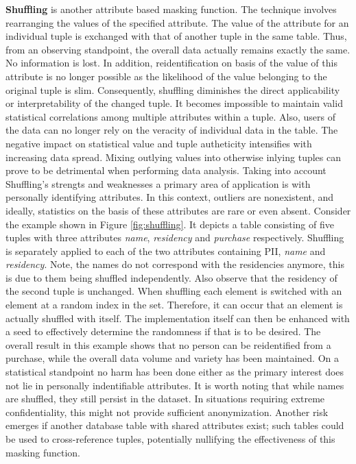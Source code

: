 \indent\textbf{Shuffling} is another attribute based masking function. The technique involves rearranging the values of the specified attribute. The value of the attribute for an individual tuple is exchanged with that of another tuple in the same table. Thus, from an observing standpoint, the overall data actually remains exactly the same. No information is lost. In addition, reidentification on basis of the value of this attribute is no longer possible as the likelihood of the value belonging to the original tuple is slim. Consequently, shuffling diminishes the direct applicability or interpretability of the changed tuple. It becomes impossible to maintain valid statistical correlations among multiple attributes within a tuple. Also, users of the data can no longer rely on the veracity of individual data in the table. The negative impact on statistical value and tuple autheticity intensifies with increasing data spread. Mixing outlying values into otherwise inlying tuples can prove to be detrimental when performing data analysis. Taking into account Shuffling's strengts and weaknesses a primary area of application is with personally identifying attributes. In this context, outliers are nonexistent, and ideally, statistics on the basis of these attributes are rare or even absent. Consider the example shown in Figure \ref{fig:shuffling}. It depicts a table consisting of five tuples with three attributes \textit{name}, \textit{residency} and \textit{purchase} respectively. Shuffling is separately applied to each of the two attributes containing \ac{PII}, \textit{name} and \textit{residency}. Note, the names do not correspond with the residencies anymore, this is due to them being shuffled independently. Also observe that the residency of the second tuple is unchanged. When shuffling each element is switched with an element at a random index in the set. Therefore, it can occur that an element is actually shuffled with itself. The implementation itself can then be enhanced with a seed to effectively determine the randomness if that is to be desired. The overall result in this example shows that no person can be reidentified from a purchase, while the overall data volume and variety has been maintained. On a statistical standpoint no harm has been done either as the primary interest does not lie in personally indentifiable attributes. It is worth noting that while names are shuffled, they still persist in the dataset. In situations requiring extreme confidentiality, this might not provide sufficient anonymization. Another risk emerges if another database table with shared attributes exist; such tables could be used to cross-reference tuples, potentially nullifying the effectiveness of this masking function.


